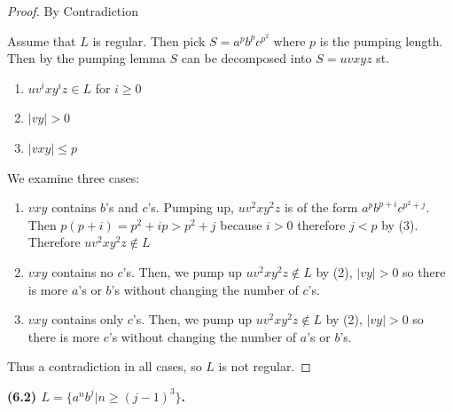 \documentclass[11pt]{article}
\begin{document}
\begin{proof} By Contradiction

Assume that $L$ is regular. Then pick $S = a^p b^p c^{p^2}$ where $p$ is the pumping length. Then by the pumping lemma $S$ can be decomposed into $S = uvxyz$ st.

\begin{enumerate}[(1)]

 \item $uv^ixy^iz \in L$ for $i \geq 0$
 \item $|vy| > 0$
 \item $|vxy| \leq p$

\end{enumerate}

We examine three cases:
\begin{enumerate}
	\item $vxy$ contains $b$'s and $c$'s. Pumping up, $uv^2xy^2z$ is of the form $a^p b^{p + i} c^{p^2 + j}$. Then $p(p+i) = p^2 + ip > p^2 + j$ because $i > 0$ therefore $j < p$ by (3). Therefore $uv^2 x y^2 z \notin L$
	\item $vxy$ contains no $c$'s. Then, we pump up $uv^2 x y^2 z \notin L$ by (2), $|vy| > 0$ so there is more $a$'s or $b$'s without changing the number of $c$'s. 
	\item $vxy$ contains only $c$'s. Then, we pump up $uv^2 x y^2 z \notin L$ by (2), $|vy| > 0$ so there is more $c$'s without changing the number of $a$'s or $b$'s.

\end{enumerate}

Thus a contradiction in all cases, so $L$ is not regular.

\end{proof}






\textbf{(6.2) $L=\{a^nb^j|n\geq (j-1)^3\}$.}
\newline
\end{document}
